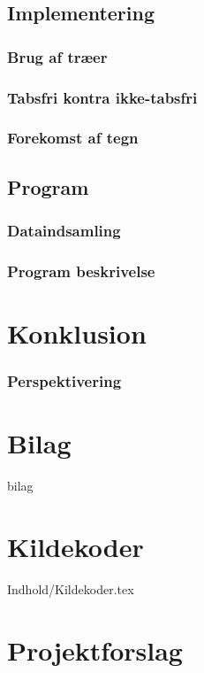 \documentclass[12pt,a4paper]{report}
\begin{document}
	\section{Implementering}
	
	\subsection{Brug af træer}
	   
   
	\subsection{Tabsfri kontra ikke-tabsfri}
	

	\subsection{Forekomst af tegn}
	

   \section{Program}

	\subsection{Dataindsamling}
	
   
%   	
   	
   	\subsection{Program beskrivelse}
   	

\chapter{Konklusion}

           

           \subsection{Perspektivering}
	




\chapter*{Bilag}
 {bilag}

\chapter*{Kildekoder}
 {Indhold/Kildekoder.tex}

\chapter*{Projektforslag}

\end{document}
